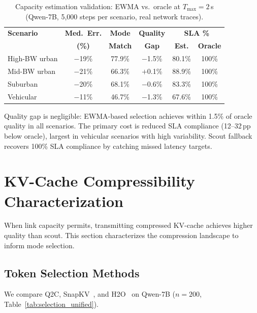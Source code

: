 \documentclass{article}
\newcommand{\QtoC}{\textsc{Q2C}\xspace}
\begin{document}
\begin{table}[t]
\centering
\caption{Capacity estimation validation: EWMA vs.\ oracle at $T_{\max} = 2$\,s (Qwen-7B, 5{,}000 steps per scenario, real network traces).}
\label{tab:bw_validation}
\footnotesize
\begin{tabular}{@{}lccccc@{}}
\toprule
\textbf{Scenario} & \textbf{Med.\ Err.} & \textbf{Mode} & \textbf{Quality} & \multicolumn{2}{c}{\textbf{SLA \%}} \\
                   & \textbf{(\%)} & \textbf{Match} & \textbf{Gap} & \textbf{Est.} & \textbf{Oracle} \\
\midrule
High-BW urban  & $-$19\%  & 77.9\% & $-$1.5\% & 80.1\% & 100\% \\
Mid-BW urban   & $-$21\%  & 66.3\% & $+$0.1\% & 88.9\% & 100\% \\
Suburban        & $-$20\%  & 68.1\% & $-$0.6\% & 83.3\% & 100\% \\
Vehicular       & $-$11\%  & 46.7\% & $-$1.3\% & 67.6\% & 100\% \\
\bottomrule
\end{tabular}
\end{table}

Quality gap is negligible: EWMA-based selection achieves within 1.5\% of oracle quality in all scenarios.
The primary cost is reduced SLA compliance (12--32\,pp below oracle), largest in vehicular scenarios with high variability.
Scout fallback recovers 100\% SLA compliance by catching missed latency targets.


\section{KV-Cache Compressibility Characterization}
\label{sec:compression}

When link capacity permits, transmitting compressed KV-cache achieves higher quality than scout.
This section characterizes the compression landscape to inform mode selection.

\subsection{Token Selection Methods}

We compare \QtoC, SnapKV~\citep{snapkv}, and H2O~\citep{h2o} on Qwen-7B ($n = 200$, Table~\ref{tab:selection_unified}).
\end{document}
